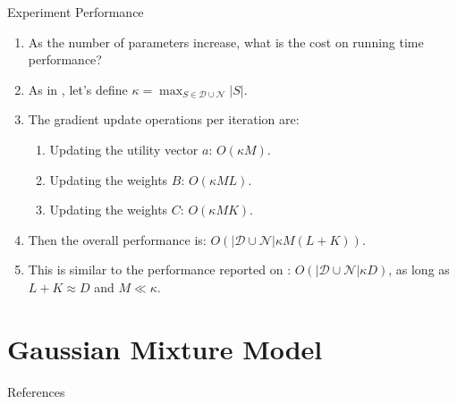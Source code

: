 \documentclass{beamer}
\begin{document}
\begin{frame}{Experiment Performance}
  \begin{enumerate}
    \item As the number of parameters increase, what is the cost on running time performance?
    \item As in \cite{tschiatschek16learning}, let's define $\kappa = \max_{S \in \mathcal{D} \cup \mathcal{N}}|S|$.
    \item The gradient update operations per iteration are:
    \begin{enumerate}
      \item Updating the utility vector $a$: $O(\kappa M)$.
      \item Updating the weights $B$: $O(\kappa M L)$.
      \item Updating the weights $C$: $O(\kappa M K)$.
    \end{enumerate}
    \item Then the overall performance is: $O(|\mathcal{D} \cup \mathcal{N}| \kappa M (L + K))$.
    \item This is similar to the performance reported on \cite{tschiatschek16learning}: $O(|\mathcal{D} \cup \mathcal{N}| \kappa D)$, as long as $L + K \approx D$ and $M \ll \kappa$.
  \end{enumerate}
\end{frame}

\section{Gaussian Mixture Model}

\begin{frame}{References}
  
  
\end{frame}
\end{document}

